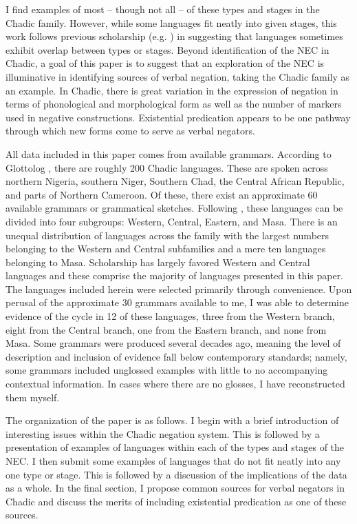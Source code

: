 \documentclass[output=paper,draft,draftmode,colorlinks,citecolor=brown]{langscibook}
\begin{document}
I find examples of most -- though not all -- of these types and stages in the Chadic family. However, while some languages fit neatly into given stages, this work follows previous scholarship (e.g. \citealt{Veselinova2016}) in suggesting that languages sometimes exhibit overlap between types or stages.  Beyond identification of the NEC in Chadic, a goal of this paper is to suggest that an exploration of the NEC is illuminative in identifying sources of verbal negation, taking the Chadic family as an example. In Chadic, there is great variation in the expression of negation in terms of phonological and morphological form as well as the number of markers used in negative constructions. Existential predication appears to be one pathway through which new forms come to serve as verbal negators. 

All data included in this paper comes from available grammars. According to
Glottolog \citep{HammarstromBank2018}, there are roughly 200 Chadic
languages. These are spoken across northern Nigeria, southern Niger,
Southern Chad, the Central African Republic, and parts of Northern
Cameroon. Of these, there exist an approximate 60 available grammars or
grammatical sketches. Following \citet{Newman2000}, these languages can be
divided into four subgroups: Western, Central, Eastern, and Masa. There is
an unequal distribution of languages across the family with the largest
numbers belonging to the Western and Central subfamilies and a mere ten
languages belonging to Masa. Scholarship has largely favored Western and
Central languages and these comprise the majority of languages presented in
this paper. The languages included herein were selected primarily through
convenience. Upon perusal of the approximate 30 grammars available to me, I
was able to determine evidence of the cycle in 12 of these languages, three
from the Western branch, eight from the Central branch, one from the Eastern branch, and none from
Masa. Some grammars were produced several decades ago, meaning the level
of description and inclusion of evidence fall below contemporary standards;
namely, some grammars included unglossed examples with little to no
accompanying contextual information. In cases where there are no glosses, I
have reconstructed them myself.  

The organization of the paper is as follows. I begin with a brief
introduction of interesting issues within the Chadic negation system. This
is followed by a presentation of examples of languages within each of the
types and stages of the NEC. I then submit some examples of languages that
do not fit neatly into any one type or stage. This is followed by a
discussion of the implications of the data as a whole. In the final
section, I propose common sources for verbal negators in Chadic and discuss
the merits of including existential predication as one of these sources.
\end{document}
